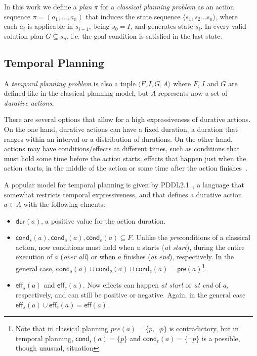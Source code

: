 \documentclass[runningheads]{llncs}
\newcommand{\tup}[1]{{\langle #1 \rangle}}
\newcommand{\pre}{\mathsf{pre}}    %
\newcommand{\eff}{\mathsf{eff}}    %
\newcommand{\cond}{\mathsf{cond}}  %
\newcommand{\dur}{\mathsf{dur}}    %
\begin{document}
In this work we define a {\em plan} $\pi$ for a {\em classical planning problem} as an action sequence $\pi=(a_1,\ldots,a_n)$ that induces the state sequence $\tup{s_1,s_2\ldots s_n}$, where each $a_i$ is applicable in $s_{i-1}$, being $s_0=I$, and generates state $s_i$. In every valid solution plan $G\subseteq s_n$, i.e. the goal condition is satisfied in the last state. 

\subsection{Temporal Planning}
\label{sec:temporalplanning}

A {\em temporal planning problem} is also a tuple $\tup{F,I,G,A}$ where $F$, $I$ and $G$ are defined like in the classical planning model, but $A$ represents now a set of {\em durative actions}.

There are several options that allow for a high expressiveness of durative actions. On the one hand, durative actions can have a fixed duration, a duration that ranges within an interval or a distribution of durations. On the other hand, actions may have conditions/effects at different times, such as conditions that must hold some time before the action starts, effects that happen just when the action starts, in the middle of the action or some time after the action finishes~\cite{garrido2009constraint}.

A popular model for temporal planning is given by PDDL2.1~\cite{fox2003pddl2}, a language that somewhat restricts temporal expressiveness, and that defines a durative action $a\in A$ with the following elments:

\begin{itemize}

\item $\dur(a)$, a positive value for the action duration.

\item $\cond_s(a), \cond_o(a), \cond_e(a) \subseteq F$. Unlike the \emph{pre}conditions of a classical action, now conditions must hold when $a$ starts ({\em at start}), during the entire execution of $a$ ({\em over all}) or when $a$ finishes ({\em at end}), respectively. In the general case, $\cond_s(a) \cup \cond_o(a) \cup \cond_e(a) = \pre(a)$\footnote{Note that in classical planning $pre(a)=\{p,\neg p\}$ is contradictory, but in temporal planning, $\cond_s(a)=\{p\}$ and $\cond_e(a)=\{\neg p\}$ is a possible, though unusual, situation}.

\item $\eff_s(a)$ and $\eff_e(a)$. Now effects can happen {\em at start} or {\em at end} of $a$, respectively, and can still be positive or negative. Again, in the general case $\eff_s(a) \cup \eff_e(a) = \eff(a)$.
\end{itemize}
\end{document}
